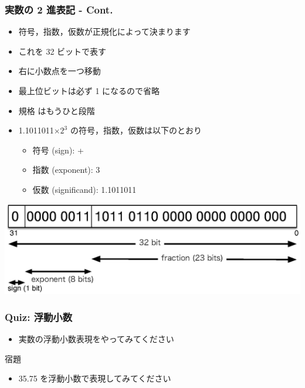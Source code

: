 \begin{frame}[shrink]
\frametitle{実数の 2 進表記 - Cont.}
  \begin{itemize}
\item 符号，指数，仮数が正規化によって決まります
\item これを 32 ビットで表す
\item 右に小数点を一つ移動
\item 最上位ビットは必ず 1 になるので省略
\item 規格 \href{http://ieeexplore.ieee.org/xpl/mostRecentIssue.jsp?punumber=2355}{} はもうひと段階
  \end{itemize}
  \begin{center}
    \begin{example}
      \begin{itemize}
\item 1.1011011\(\times 2^3\) の符号，指数，仮数は以下のとおり
        \begin{itemize}
\item 符号 (sign): +
\item 指数 (exponent): 3
\item 仮数 (significand): 1.1011011
        \end{itemize}
      \end{itemize}
    \end{example}
\includegraphics[scale=.4]{./Figure/elementaryCS-figFloatingPointFormat.eps}
  \end{center}
\end{frame}
\begin{frame}
\frametitle{Quiz: 浮動小数}
  \begin{itemize}
\item 実数の浮動小数表現をやってみてください
  \end{itemize}
  \begin{block}{宿題}
    \begin{itemize}
\item 35.75 を浮動小数で表現してみてください
    \end{itemize}
  \end{block}
\end{frame}
